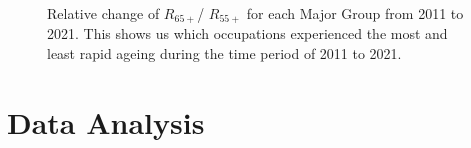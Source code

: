 \documentclass[11pt]{article}
\begin{document}
\begin{figure}[!htb]
	\centering
	\hfill
	\hfill
	\caption{Relative change of $R_{65+}$/ $R_{55+}$ for each Major Group from 2011 to 2021. This shows us which occupations experienced the most and least rapid ageing during the time period of 2011 to 2021.}
	\label{fig:relativechange}
\end{figure}



\clearpage

\section{Data Analysis}
\end{document}

